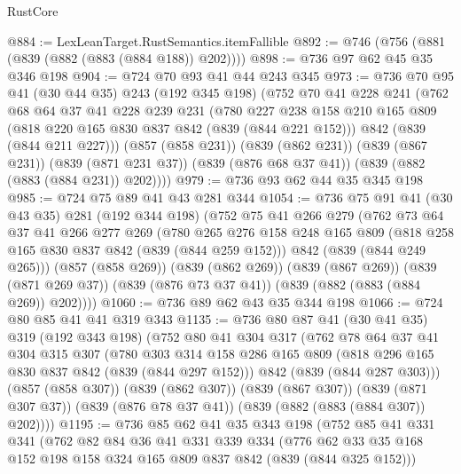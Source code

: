 \begin{lexlean}{RustCore}
\begin{coremodule}
@884 := LexLeanTarget.RustSemantics.itemFallible
@892 := @746 (@756 (@881 (@839 (@882 (@883 (@884 @188)) @202))))
@898 := @736 @97 @62 @45 @35 @346 @198
@904 := @724 @70 @93 @41 @44 @243 @345
@973 := @736
    @70
    @95
    @41
    (@30 @44 @35)
    @243
    (@192 @345 @198)
    (@752
      @70
      @41
      @228
      @241
      (@762
        @68
        @64
        @37
        @41
        @228
        @239
        @231
        (@780
          @227
          @238
          @158
          @210
          @165
          @809
          (@818 @220 @165 @830 @837 @842 (@839 (@844 @221 @152)))
          @842
          (@839 (@844 @211 @227)))
        (@857 (@858 @231))
        (@839 (@862 @231))
        (@839 (@867 @231))
        (@839 (@871 @231 @37))
        (@839 (@876 @68 @37 @41))
        (@839 (@882 (@883 (@884 @231)) @202))))
@979 := @736 @93 @62 @44 @35 @345 @198
@985 := @724 @75 @89 @41 @43 @281 @344
@1054 := @736
    @75
    @91
    @41
    (@30 @43 @35)
    @281
    (@192 @344 @198)
    (@752
      @75
      @41
      @266
      @279
      (@762
        @73
        @64
        @37
        @41
        @266
        @277
        @269
        (@780
          @265
          @276
          @158
          @248
          @165
          @809
          (@818 @258 @165 @830 @837 @842 (@839 (@844 @259 @152)))
          @842
          (@839 (@844 @249 @265)))
        (@857 (@858 @269))
        (@839 (@862 @269))
        (@839 (@867 @269))
        (@839 (@871 @269 @37))
        (@839 (@876 @73 @37 @41))
        (@839 (@882 (@883 (@884 @269)) @202))))
@1060 := @736 @89 @62 @43 @35 @344 @198
@1066 := @724 @80 @85 @41 @41 @319 @343
@1135 := @736
    @80
    @87
    @41
    (@30 @41 @35)
    @319
    (@192 @343 @198)
    (@752
      @80
      @41
      @304
      @317
      (@762
        @78
        @64
        @37
        @41
        @304
        @315
        @307
        (@780
          @303
          @314
          @158
          @286
          @165
          @809
          (@818 @296 @165 @830 @837 @842 (@839 (@844 @297 @152)))
          @842
          (@839 (@844 @287 @303)))
        (@857 (@858 @307))
        (@839 (@862 @307))
        (@839 (@867 @307))
        (@839 (@871 @307 @37))
        (@839 (@876 @78 @37 @41))
        (@839 (@882 (@883 (@884 @307)) @202))))
@1195 := @736
    @85
    @62
    @41
    @35
    @343
    @198
    (@752
      @85
      @41
      @331
      @341
      (@762
        @82
        @84
        @36
        @41
        @331
        @339
        @334
        (@776 @62 @33 @35 @168 @152 @198 @158 @324 @165 @809 @837 @842 (@839 (@844 @325 @152)))

\end{coremodule}
\end{lexlean}

